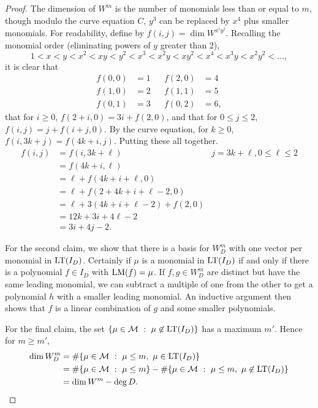 \begin{proof}
  The dimension of $W^m$ is the number of monomials less than or equal to $m$,
  though modulo the curve equation $C$, $y^3$ can be replaced by $x^4$ plus smaller monomials.
  For readability, define by $f(i,j) = \dim W^{x^iy^j}$.
  Recalling the monomial order (eliminating powers of $y$ greater than 2),
    \[ 1 < x < y < x^2 < xy < y^2 < x^3 < x^2y < xy^2 < x^4 < x^3y < x^2y^2 < \dots, \]
  it is clear that
  \begin{align*}
    f(0,0) &= 1 && f(2,0) &= 4 \\
    f(1,0) &= 2 && f(1,1) &= 5 \\
    f(0,1) &= 3 && f(0,2) &= 6,
  \end{align*}
  that for $i \geq 0$, $f(2 + i,0) = 3i + f(2, 0)$, and that for $0 \leq j \leq 2$, $f(i,j) = j + f(i+j,0)$.
  By the curve equation, for $k \geq 0$, $f(i, 3k + j) = f(4k + i, j)$.
  Putting these all together.
  \begin{align*}
    f(i,j)
      &= f(i, 3k + \ell) & j = 3k + \ell, 0 \leq \ell \leq 2 \\
      &= f(4k + i, \ell) \\
      &= \ell + f(4k + i + \ell, 0) \\
      &= \ell + f(2 + 4k + i + \ell - 2, 0) \\
      &= \ell + 3(4k + i + \ell - 2) + f(2, 0) \\
      &= 12k + 3i + 4\ell - 2 \\
      &= 3i + 4j - 2.
  \end{align*}
  
  For the second claim, we show that there is a basis for $W_D^m$ with one vector per monomial in $\operatorname{LT}(I_D)$.
  Certainly if $\mu$ is a monomial in $\operatorname{LT}(I_D)$ if and only if there is a polynomial $f \in I_D$ with $\operatorname{LM}(f) = \mu$.
  If $f, g \in W_D^m$ are distinct but have the same leading monomial,
  we can subtract a multiple of one from the other to get a polynomial $h$ with a smaller leading monomial.
  An inductive argument then shows that $f$ is a linear combination of $g$ and some smaller polynomials.
  
  For the final claim, the set $\{ \mu \in \mathcal{M} ~:~ \mu \not\in \operatorname{LT}(I_D) \}$ has a maximum $m'$.
  Hence for $m \geq m'$,
  \begin{align*}
    \dim W_D^m
      &= \# \{ \mu \in \mathcal{M} ~:~ \mu \leq m, ~\mu \in \operatorname{LT}(I_D) \} \\
      &= \# \{ \mu \in \mathcal{M} ~:~ \mu \leq m \} - \# \{ \mu \in \mathcal{M} ~:~ \mu \leq m, ~\mu \not\in \operatorname{LT}(I_D) \} \\
      &= \dim W^m - \deg D.
  \end{align*}
\end{proof}

